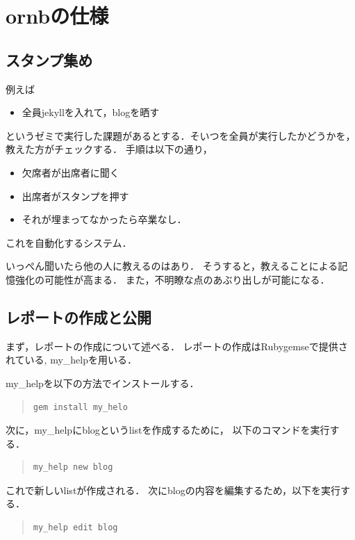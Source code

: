 \documentclass{jsarticle}
\begin{document}
\section{ornbの仕様}
\label{sec:orgefd3236}
\subsection{スタンプ集め}
\label{sec:orgc6db6d9}
例えば
\begin{itemize}
\item 全員jekyllを入れて，blogを晒す
\end{itemize}
というゼミで実行した課題があるとする．そいつを全員が実行したかどうかを，教えた方がチェックする．
手順は以下の通り，
\begin{itemize}
\item 欠席者が出席者に聞く
\item 出席者がスタンプを押す
\item それが埋まってなかったら卒業なし．
\end{itemize}
これを自動化するシステム．

いっぺん聞いたら他の人に教えるのはあり．
そうすると，教えることによる記憶強化の可能性が高まる．
また，不明瞭な点のあぶり出しが可能になる．

\subsection{レポートの作成と公開}
\label{sec:org51bcc33}
まず，レポートの作成について述べる．
レポートの作成はRubygemseで提供されている,
my\_helpを用いる．

my\_helpを以下の方法でインストールする．
\begin{quote}
\begin{verbatim}
gem install my_helo
\end{verbatim}
\end{quote}

次に，my\_helpにblogというlistを作成するために，
以下のコマンドを実行する．

\begin{quote}
\begin{verbatim}
my_help new blog
\end{verbatim}
\end{quote}

これで新しいlistが作成される．
次にblogの内容を編集するため，以下を実行する．
\begin{quote}
\begin{verbatim}
my_help edit blog
\end{verbatim}
\end{quote}
\end{document}
